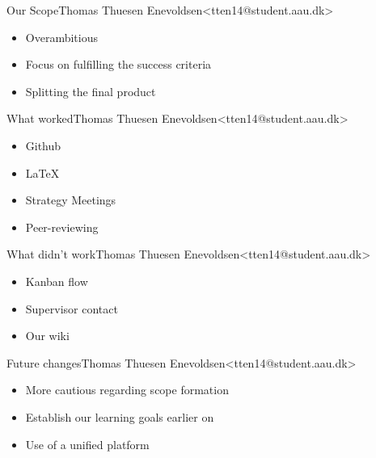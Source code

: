 \begin{frame}{Our Scope}{Thomas Thuesen Enevoldsen\newline<tten14@student.aau.dk>}
    \begin{itemize}
  	\item<2-> Overambitious
  	\item<3-> Focus on fulfilling the success criteria
  	\item<4-> Splitting the final product
  \end{itemize}
\end{frame}

\begin{frame}{What worked}{Thomas Thuesen Enevoldsen\newline<tten14@student.aau.dk>}
    \begin{itemize}
  	\item Github
  	\item LaTeX
  	\item Strategy Meetings
  	\item Peer-reviewing
  \end{itemize}
\end{frame}

\begin{frame}{What didn't work}{Thomas Thuesen Enevoldsen\newline<tten14@student.aau.dk>}
    \begin{itemize}
  	\item Kanban flow
  	\item Supervisor contact
  	\item Our wiki
  \end{itemize}
\end{frame}

\begin{frame}{Future changes}{Thomas Thuesen Enevoldsen\newline<tten14@student.aau.dk>}
    \begin{itemize}
  	\item More cautious regarding scope formation
  	\item Establish our learning goals earlier on
  	\item Use of a unified platform 
  \end{itemize}
\end{frame}